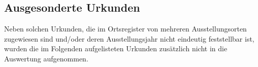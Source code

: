 
\subsection{Ausgesonderte Urkunden}
\label{subsec:ausgesurk}

Neben solchen Urkunden, die im Ortsregister von \citet{cao-online} mehreren
Ausstellungsorten zugewiesen sind und/oder deren Ausstellungsjahr nicht
eindeutig feststellbar ist, wurden die im Folgenden aufgelisteten Urkunden
zusätzlich nicht in die Auswertung aufgenommen.




